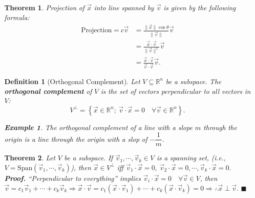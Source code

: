 \documentclass[12pt, a4paper]{article}
\newtheorem{thm}{Theorem}[subsection]
\newtheorem{df}{Definition}[subsection]
\newtheorem{eg}{Example}[subsection]
\newenvironment*{prf}{\indent\textbf{\textit{Proof. }}}{\hfill $\blacksquare$\par}
\def\R{{\mathbb{R}}}
\def\Span{\mathrm{Span}}
\def\vecx{\vec{x}}
\def\vecv{\vec{v}}
\begin{document}
\begin{thm}
	Projection of $\vecx$ into line spanned by $\vecv$ is given by the following formula: 
	$$\begin{aligned}
		\text{Projection}=c\vecv&=\frac{\|\vecx\|\cos\theta}{\|\vecv\|}\vecv\\
		&=\frac{\vecx\cdot\vecv}{\|\vecv\|^2}\vecv\\
		&=\frac{\vecx\cdot\vecv}{\vecv\cdot\vecv}\vecv.
	\end{aligned}$$	
\end{thm}
\begin{df}[Orthogonal Complement]
	Let $V\subseteq\R^n$ be a subspace. The \textbf{orthogonal complement} of $V$ is the set of vectors perpendicular to all vectors in $V$: 
	\[V^\perp=\left\{\vecx\in\R^n;\ \vecv\cdot\vecx=0\quad\forall\vecv\in\R^n\right\}.\]	
	\begin{eg} The orthogonal complement of a line with a slope $m$ through the origin is a line through the origin with a slop of $-\dfrac{1}{m}$. \end{eg}
\end{df}
\begin{thm}
	Let $V$ be a subspace. If $\vecv_1,\cdots,\vecv_k\in V$ is a spanning set, (i.e., $V=\Span(\vecv_1,\cdots,\vecv_k)$), then $\vecx\in V^\perp$ \emph{iff} $\vecv_1\cdot\vecx=0,\ \vecv_2\cdot\vecx=0,\cdots,\vecv_k\cdot\vecx=0.$\\
	\begin{prf}
		``Perpendicular to everything'' implies $\vecv_i\cdot\vecx=0\quad\forall\vecv\in V$, then $\vecv=c_1\vecv_1+\cdots+c_k\vecv_k\Longrightarrow\vecx\cdot\vecv=c_1(\vecx\cdot\vecv_1)+\cdots+c_k(\vecx\cdot\vecv_k)=0\Longrightarrow\therefore\vecx\perp\vecv.$
	\end{prf}
\end{thm}
\end{document}
